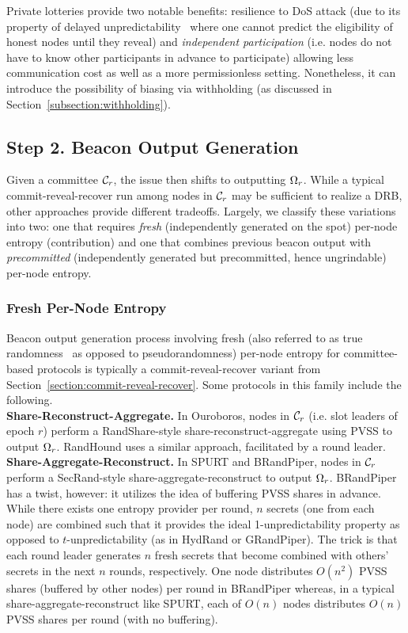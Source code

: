 Private lotteries provide two notable benefits: resilience to DoS attack (due to its property of delayed unpredictability~\cite{azouvi2018winning} where one cannot predict the eligibility of honest nodes until they reveal) and \textit{independent participation} (i.e. nodes do not have to know other participants in advance to participate) allowing less communication cost as well as a more permissionless setting. Nonetheless, it can introduce the possibility of biasing via withholding (as discussed in Section~\ref{subsection:withholding}).

\subsection{Step 2. Beacon Output Generation}
\label{subsection:beacon-output-generation}
Given a committee $\mathcal{C}_r$, the issue then shifts to outputting $\Omega_r$. While a typical commit-reveal-recover run among nodes in $\mathcal{C}_r$ may be sufficient to realize a DRB, other approaches provide different tradeoffs. Largely, we classify these variations into two: one that requires \textit{fresh} (independently generated on the spot) per-node entropy (contribution) and one that combines previous beacon output with \textit{precommitted} (independently generated but precommitted, hence ungrindable) per-node entropy.

\subsubsection{Fresh Per-Node Entropy}
\label{subsubsection:fresh}
Beacon output generation process involving fresh (also referred to as true randomness~\cite{cascudomt, das2021spurt} as opposed to pseudorandomness) per-node entropy for committee-based protocols is typically a commit-reveal-recover variant from Section~\ref{section:commit-reveal-recover}. Some protocols in this family include the following.\\

\noindent\textbf{Share-Reconstruct-Aggregate.} In Ouroboros, nodes in $\mathcal{C}_r$ (i.e. slot leaders of epoch $r$) perform a RandShare-style share-reconstruct-aggregate using PVSS to output $\Omega_r$. RandHound uses a similar approach, facilitated by a round leader.\\

\noindent\textbf{Share-Aggregate-Reconstruct.} In SPURT and BRandPiper, nodes in $\mathcal{C}_r$ perform a SecRand-style share-aggregate-reconstruct to output $\Omega_r$. BRandPiper has a twist, however: it utilizes the idea of buffering PVSS shares in advance. While there exists one entropy provider per round, $n$ secrets (one from each node) are combined such that it provides the ideal 1-unpredictability property as opposed to $t$-unpredictability (as in HydRand or GRandPiper). The trick is that each round leader generates $n$ fresh secrets that become combined with others' secrets in the next $n$ rounds, respectively. One node distributes $O(n^2)$ PVSS shares (buffered by other nodes) per round in BRandPiper whereas, in a typical share-aggregate-reconstruct like SPURT, each of $O(n)$ nodes distributes $O(n)$ PVSS shares per round (with no buffering).\\

